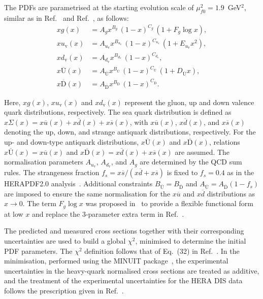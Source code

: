 \documentclass[12pt]{article}
\begin{document}
The PDFs are parametrised at the starting evolution scale of $\mu^2_{f0} = 1.9$~GeV$^2$, similar as in Ref.~\cite{Abramowicz:2015mha} and Ref.~\cite{Bonvini:2019wxf}, as follows:
\begin{equation}\begin{aligned}
xg(x) &= A_{g} x^{B_{g}}\,(1-x)^{C_{g}}\, (1 + F_{g} {\log x}),\\
xu_\mathrm{v}(x) &= A_{u_\mathrm{v}}x^{B_{u_\mathrm{v}}}\,(1-x)^{C_{u_\mathrm{v}}}\,(1+E_{u_\mathrm{v}}x^2) ,\\
xd_\mathrm{v}(x) &= A_{d_\mathrm{v}}x^{B_{d_\mathrm{v}}}\,(1-x)^{C_{d_\mathrm{v}}},\\
x\overline{\mathrm{U}}(x)&= A_{\overline{\mathrm{U}}}x^{B_{\overline{\mathrm{U}}}}\, (1-x)^{C_{\overline{\mathrm{U}}}}\, (1+D_{\overline{\mathrm{U}}}x), \\
x\overline{\mathrm{D}}(x)&= A_{\overline{\mathrm{D}}}x^{B_{\overline{\mathrm{D}}}}\, (1-x)^{C_{\overline{\mathrm{D}}}}.
\end{aligned}
\label{eq:dv}
\end{equation}

Here, $xg(x)$, $xu_{\mathrm{v}}(x)$ and $xd_{\mathrm{v}}(x)$ represent the gluon, up and down valence quark distributions, respectively. The sea quark distribution is defined as $x\Sigma(x)=x\overline{u}(x)+x\overline{d}(x)+x\overline{s}(x)$, with $x\overline{u}(x)$, $x\overline{d}(x)$, and $x\overline{s}(x)$ denoting the up, down, and strange antiquark distributions, respectively.
For the up- and down-type antiquark distributions, $x\overline{\mathrm{U}}(x)$ and $x\overline{\mathrm{D}}(x)$, relations $x\overline{\mathrm{U}}(x) = x\overline{u}(x)$ and $x\overline{\mathrm{D}}(x) = x\overline{d}(x) + x\overline{s}(x)$  are assumed.
The normalisation parameters $A_{u_{\mathrm{v}}}$, $A_{d_\mathrm{v}}$, and $A_{g}$ are determined by the QCD sum rules.
The strangeness fraction $f_{s} = x\overline{s}/( x\overline{d} + x\overline{s})$ is fixed to
$f_{s}=0.4$ as in the HERAPDF2.0 analysis~\cite{Abramowicz:2015mha}.
Additional constraints $B_{\overline{\mathrm{U}}} = B_{\overline{\mathrm{D}}}$ and $A_{\overline{\mathrm{U}}} = A_{\overline{\mathrm{D}}}(1 - f_{s})$ are imposed to ensure the same normalisation for the $x\overline{u}$ and $x\overline{d}$ distributions as $x \to 0$.
The term $F_g\log x$ was proposed in~\cite{Bonvini:2019wxf} to provide a flexible functional form at low $x$ and replace the 3-parameter extra term in Ref.~\cite{Abramowicz:2015mha}.

The predicted and measured cross sections together with their corresponding uncertainties are used to build a global $\chi^2$, minimised to determine the initial PDF
parameters. The $\chi^2$ definition follows that of Eq.~(32) in Ref.~\cite{Abramowicz:2015mha}. In the minimisation, performed 
using the MINUIT package~\cite{James:1975dr}, the experimental uncertainties in the heavy-quark normalised cross 
sections are treated as additive, and the treatment of the experimental uncertainties for the HERA DIS data follows 
the prescription given in Ref.~\cite{Abramowicz:2015mha}.
\end{document}
